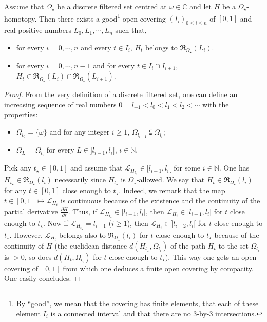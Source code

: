 \documentclass[11pt, english]{smfart}
\theoremstyle{definition}
\begin{document}
\begin{lemm}\label{RemarksurHomotopy}
Assume that $\Omega_\star$ be a discrete filtered set centred at
$\omega \in \mathbb{C}$ and let $H$ be a $\Omega_\star$-homotopy.
Then there exists a good\footnote{By ``good'', we mean that the
covering has finite  elements, that each of these element $I_i$ is a
connected interval and that there are no 3-by-3 intersections.} 
 open covering $(I_i)_{0 \leq i \leq n}$ of $[0,1]$ 
and  real positive numbers $L_0, L_1, \cdots , L_n$
such that, 
\begin{itemize}
\item for every $i = 0, \cdots, n$ and every $t \in I_i$, 
$H_t$ belongs to $\mathfrak{R}_{\Omega_\star}(L_i)$.
\item for every $i = 0, \cdots, n-1$ and for every $t \in I_i \cap
  I_{i+1}$, $H_t \in \mathfrak{R}_{\Omega_\star}(L_i) \cap
  \mathfrak{R}_{\Omega_\star}(L_{i+1})$. 
\end{itemize}
\end{lemm}

\begin{proof}
From the very definition of a discrete filtered set,
 one can define an increasing
sequence of real numbers $0=l_{-1} < l_0 <  l_1 < l_2 < \cdots $ with the
properties:
\begin{itemize}
\item $\Omega_{l_0} = \{\omega\}$ and for any integer $i \geq 1$, 
$\Omega_{l_{i-1}} \subsetneqq \Omega_{l_{i}}$;
\item  $ \Omega_{L}  =
  \Omega_{l_{i}}$ for every $L \in]l_{i-1}, l_i]$, $i \in \mathbb{N}$.
\end{itemize}
Pick any $t_\star \in [0,1]$ and assume that
$\mathcal{L}_{H_{t_\star}} \in [l_{i-1},l_i[$ for some $i \in
\mathbb{N}$. 
One has $H_{t_\star} \in
\mathfrak{R}_{\Omega_\star}(l_i)$ necessarily since $H_{t_\star}$
is $\Omega_\star$-allowed. We say that $H_{t} \in
\mathfrak{R}_{\Omega_\star}(l_i)$ for any $t \in [0,1]$ close enough to
$t_\star$. Indeed, we remark that the map $t \in [0,1]
\mapsto \displaystyle \mathcal{L}_{H_t}$ is continuous
 because of the existence and the 
continuity of the partial derivative $\displaystyle \frac{\partial
H}{ \partial s}$. Thus, if $\mathcal{L}_{H_{t_\star}} \in
]l_{i-1},l_i[$, then $\mathcal{L}_{H_{t}} \in
]l_{i-1},l_i[$ for $t$ close enough to $t_\star$. Now if
$\mathcal{L}_{H_{t_\star}} =  l_{i-1}$ ($i \geq 1$), then $\mathcal{L}_{H_{t}} \in
]l_{i-2},l_i[$ for $t$ close enough to $t_\star$. However,
$\mathcal{L}_{H_{t}}$ belongs also to
$\mathfrak{R}_{\Omega_\star}(l_i)$ for $t$ close enough to $t_\star$
because of the continuity of
$H$ (the euclidean distance $d(H_{t_\star}, \Omega_{l_i})$
of the path $H_{t}$ to the set $\Omega_{l_i}$ is $>0$, so does 
$d(H_{t}, \Omega_{l_i})$ for $t$ close enough to $t_\star$).
 This way one gets an open covering of $[0,1]$ from which one deduces a finite
open covering by compacity. One  easily concludes.
\end{proof}
\end{document}
